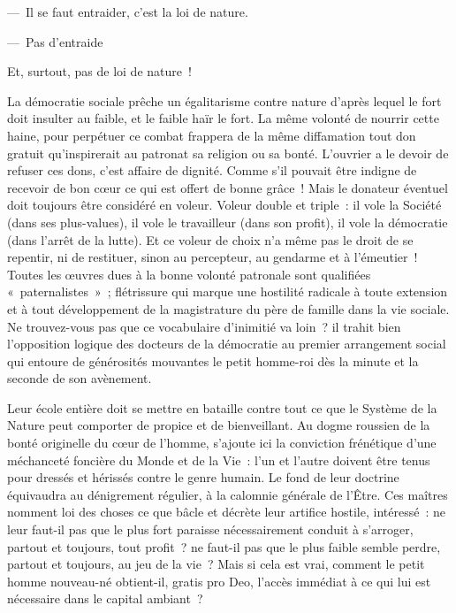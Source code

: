 \documentclass[french,twoside]{book} %
\begin{document}
— Il se faut entraider, c’est la loi de nature.\par
— Pas d’entraide\par
Et, surtout, pas de loi de nature !\par
La démocratie sociale prêche un égalitarisme contre nature d’après lequel le fort doit insulter au faible, et le faible haïr le fort. La même volonté de nourrir cette haine, pour perpétuer ce combat frappera de la même diffamation tout don gratuit qu’inspirerait au patronat sa religion ou sa bonté. L’ouvrier a le devoir de refuser ces dons, c’est affaire de dignité. Comme s’il pouvait être indigne de recevoir de bon cœur ce qui est offert de bonne grâce ! Mais le donateur éventuel doit toujours être considéré en voleur. Voleur double et triple : il vole la Société (dans ses plus-values), il vole le travailleur (dans son profit), il vole la démocratie (dans l’arrêt de la lutte). Et ce voleur de choix n’a même pas le droit de se repentir, ni de restituer, sinon au percepteur, au gendarme et à l’émeutier ! Toutes les œuvres dues à la bonne volonté patronale sont qualifiées « paternalistes » ; flétrissure qui marque une hostilité radicale à toute extension et à tout développement de la magistrature du père de famille dans la vie sociale. Ne trouvez-vous pas que ce vocabulaire d’inimitié va loin ? il trahit bien l’opposition logique des docteurs de la démocratie au premier arrangement social qui entoure de générosités mouvantes le petit homme-roi dès la minute et la seconde de son avènement.\par
Leur école entière doit se mettre en bataille contre tout ce que le Système de la Nature peut comporter de propice et de bienveillant. Au dogme roussien de la bonté originelle du cœur de l’homme, s’ajoute ici la conviction frénétique d’une méchanceté foncière du Monde et de la Vie : l’un et l’autre doivent être tenus pour dressés et hérissés contre le genre humain. Le fond de leur doctrine équivaudra au dénigrement régulier, à la calomnie générale de l’Être. Ces maîtres nomment loi des choses ce que bâcle et décrète leur artifice hostile, intéressé : ne leur faut-il pas que le plus fort paraisse nécessairement conduit à s’arroger, partout et toujours, tout profit ? ne faut-il pas que le plus faible semble perdre, partout et toujours, au jeu de la vie ? Mais si cela est vrai, comment le petit homme nouveau-né obtient-il, gratis pro Deo, l’accès immédiat à ce qui lui est nécessaire dans le capital ambiant ?\par
\end{document}
